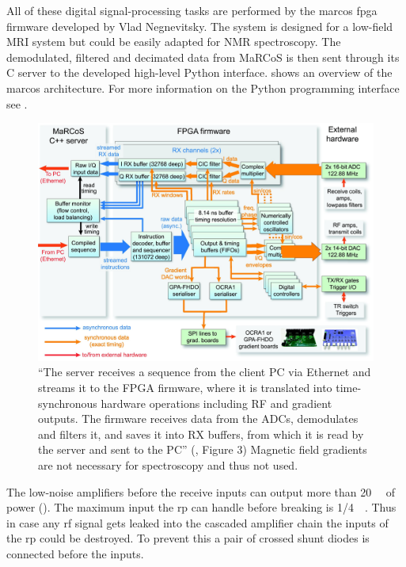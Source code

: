 All of these digital signal-processing tasks are performed by the \acrshort{marcos} \acrshort{fpga} firmware developed by Vlad Negnevitsky. The system is designed for a low-field MRI system but could be easily adapted for NMR spectroscopy. The demodulated, filtered and decimated data from MaRCoS is then sent through its C server to the developed high-level Python interface.  shows an overview of the \acrshort{marcos} architecture. For more information on the Python programming interface see .

\begin{figure}[hbt]
    \centering
    \includegraphics{images/marcos.jpg}
    \caption{ \enquote{The server receives a sequence from the client PC via Ethernet and streams it to the FPGA firmware, where it is translated into time-synchronous hardware operations including RF and gradient outputs. The firmware receives data from the ADCs, demodulates and filters it, and saves it into RX buffers, from which it is read by the server and sent to the PC} (\cite{negnevitskyMaRCoSOpensourceElectronic2023}, Figure 3) Magnetic field gradients are not necessary for spectroscopy and thus not used.}
\end{figure}

The low-noise amplifiers before the receive inputs can output more than \qty{+20}{\deci\belm} of power (). The maximum input the \acrshort{rp} can handle before breaking is \qty{1}{\vpp}/\qty{+4}{\deci\belm}. Thus in case any \acrshort{rf} signal gets leaked into the cascaded amplifier chain the inputs of the \acrshort{rp} could be destroyed. To prevent this a pair of crossed shunt diodes is connected before the inputs.

